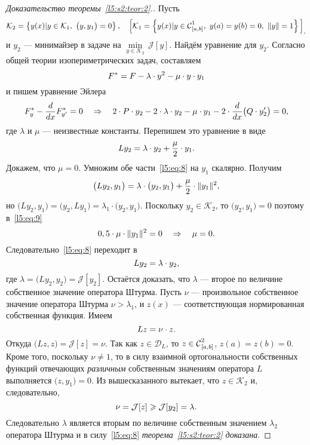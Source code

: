 \documentclass[12pt,a4paper,openany,fleqn]{book}
\newcommand{\Cf}{\ensuremath{\mathcal{C}}}
\newcommand{\J}{\ensuremath{\mathcal{J}}}
\newcommand{\mc}[1]{\ensuremath{\mathcal{#1}}}
\newcommand{\Cfn}[2][]{\ensuremath{\Cf{\mathstrut}^{#2}_{#1}}}
\newcommand{\der}[2]{\ensuremath{\frac{d#1}{d#2}}}
\newcommand{\K}{\mc{K}}
\newcommand{\norm}[1]{\ensuremath{\|#1\|}}
\theoremstyle{definition}
\begin{document}
\begin{proof}[Доказательство теоремы~\ref{l5:s2:teor:2}.] Пусть 
	\begin{equation*}
		\hfill\K_2=\left\{y(x)|y\in\K_1,\ \big(y,y_1\big)=0\right\},\quad\Big[\K_1=\left\{y(x)|y\in\Cfn[{[a,b]}]{1},\ y(a)=y(b)=0,\ \norm{y}=1\right\}\Big]_{\displaystyle.}\hfill
	\end{equation*} 
и $y_2$ --- минимайзер в задаче на $\min\limits_{y\in\K_2}\,\J[y]$. Найдём уравнение для $y_2$. Согласно общей теории изопериметрических задач, составляем 
\begin{equation*}
	\hfill F^{\ast}=F-\lambda\cdot y^2-\mu\cdot y\cdot y_1\hfill
\end{equation*}
и пишем уравнение Эйлера 
\begin{equation*}
	\hfill F^{\ast}_y-\der{}{x}F^{\ast}_{y'}=0\quad\Rightarrow\quad 2\cdot P\cdot y_2-2\cdot\lambda\cdot y_2-\mu\cdot y_1-2\cdot\der{}{x}\big(Q\cdot y'_2\big)=0,\hfill
\end{equation*}
где $\lambda$ и $\mu$ --- неизвестные константы. Перепишем это уравнение в виде
\begin{equation}
	\label{l5:eq:8}
	\hfill Ly_2=\lambda\cdot y_2+\frac{\mu}2\cdot y_1.\hfill
\end{equation}
Докажем, что $\mu=0$. Умножим обе части~\eqref{l5:eq:8} на $y_1$ скалярно. Получим
\begin{equation}
	\label{l5:eq:9}
	\hfill\big(Ly_2,y_1\big)=\lambda\cdot\big(y_2,y_1\big)+\frac{\mu}{2}\cdot \norm{y_1}^2,\hfill
\end{equation} 
но $\big(Ly_2,y_1\big)=\big(y_2,Ly_1\big)=\lambda_1\cdot\big(y_2,y_1\big)$. Поскольку $y_2\in\K_2$, то $\big(y_2,y_1\big)=0$ поэтому в~\eqref{l5:eq:9}
\begin{equation*}
	\hfill 0,5\cdot\mu\cdot\norm{y_1}^2=0\quad\Rightarrow\quad\mu=0.\hfill
\end{equation*}
Следовательно~\eqref{l5:eq:8} переходит в 
\begin{equation*}
	\hfill Ly_2=\lambda\cdot y_2,\hfill
\end{equation*}
где $\lambda=\big(Ly_2,y_2\big)=\J[y_2]$. Остаётся доказать, что $\lambda$ --- второе по величине собственное значение оператора Штурма. Пусть $\nu$ --- произвольное собственное значение оператора Штурма $\nu>\lambda_1$, и $z(x)$ --- соответствующая нормированная собственная функция. Имеем 
\begin{equation*}
	\hfill Lz=\nu\cdot z.\hfill
\end{equation*}
Откуда $\big(Lz,z\big)=\J[z]=\nu$. Так как $z\in\mc{D}_{L}$, то $z\in\Cfn[{[a,b]}]{2}$, $z(a)=z(b)=0$. Кроме того, поскольку $\nu\neq1$, то в силу взаимной ортогональности собственных функций отвечающих \emph{различным} собственным значениям оператора $L$ выполняется $\big(z,y_1\big)=0$. Из вышесказанного вытекает, что $z\in\K_2$ и, следовательно,
\begin{equation*}
	\hfill\nu=\J[z]\geqslant\J[y_2]=\lambda.\hfill
\end{equation*} 
Следовательно $\lambda$ является вторым по величине собственным значением $\lambda_2$ оператора Штурма и в силу~\eqref{l5:eq:8} \emph{теорема~\ref{l5:s2:teor:2} доказана}. 
\end{proof}
\end{document}
